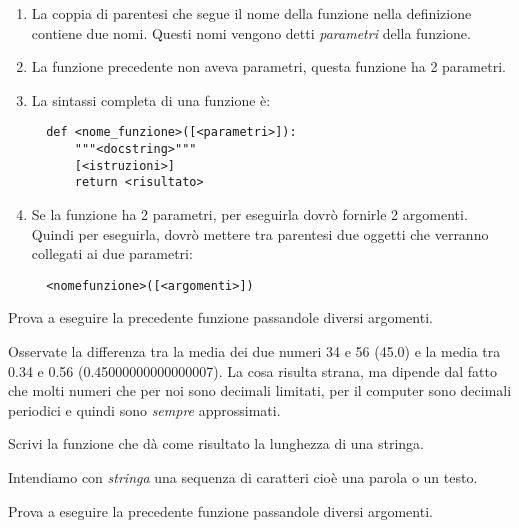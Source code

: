 \begin{osservazione}
\begin{enumerate} [nosep]
\item La coppia di parentesi che segue il nome della funzione nella 
definizione contiene due nomi. Questi nomi vengono detti \emph{parametri} 
della funzione.
\item La funzione precedente non aveva parametri, questa funzione ha 2 
parametri.
\item La sintassi completa di una funzione è:
\begin{lstlisting}
  def <nome_funzione>([<parametri>]):
      """<docstring>"""
      [<istruzioni>]
      return <risultato>
\end{lstlisting}
\item Se la funzione ha 2 parametri, per eseguirla dovrò fornirle 2 
argomenti. 
Quindi per eseguirla, dovrò mettere tra parentesi due oggetti che verranno 
collegati ai due parametri:
\begin{lstlisting}
  <nomefunzione>([<argomenti>])
\end{lstlisting}
\end{enumerate}
\end{osservazione}

Prova a eseguire la precedente funzione passandole diversi argomenti.

\begin{osservazione}
Osservate la differenza tra la media dei due numeri 34 e 56 (45.0) e 
la media tra 0.34 e 0.56 (0.45000000000000007). 
La cosa risulta strana, ma dipende dal fatto che molti 
numeri che per noi sono decimali limitati, per il computer sono decimali 
periodici e quindi sono \emph{sempre} approssimati.
\end{osservazione}

\begin{esempio}
Scrivi la funzione che dà come risultato la lunghezza di una stringa.

\begin{osservazione}
Intendiamo con \emph{stringa} una sequenza di caratteri cioè una parola o 
un testo.
\end{osservazione}


Prova a eseguire la precedente funzione passandole diversi argomenti.
\end{esempio}

